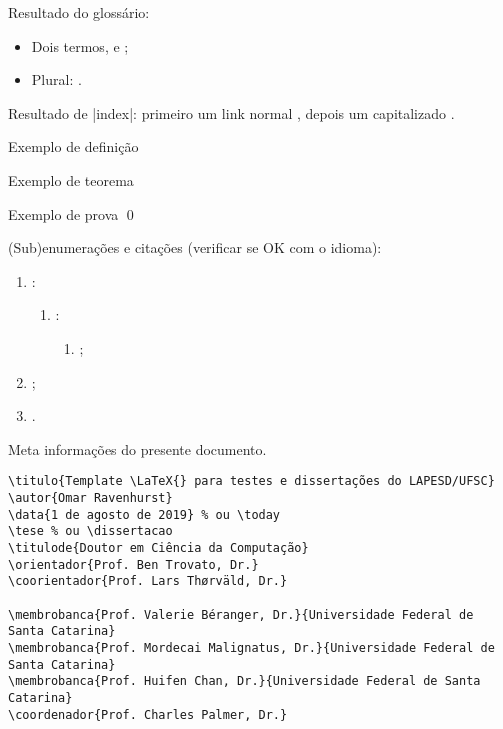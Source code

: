 Resultado do glossário:
\begin{itemize}
\item Dois termos, \polling e \proxy;
\item Plural: \proxys.
\end{itemize}

Resultado de \mla|index|: primeiro um link normal , depois um capitalizado .

\begin{defn}
  Exemplo de definição
\end{defn}

\begin{theorem}
  Exemplo de teorema
\end{theorem}

\begin{theoremproof}
  Exemplo de prova \qed
\end{theoremproof}

(Sub)enumerações e citações (verificar se OK com o idioma):
\begin{enumerate}
\item \cite{turing1937}:
  \begin{enumerate}
  \item {}:
    \begin{enumerate}
    \item {};
    \end{enumerate}
  \end{enumerate}
\item \cite{turing1937,dijkstra1968};
\item {}.
\end{enumerate}


\begin{listing}[tb]
\caption{Meta informações do presente documento.}
\label{lst:meta}
\begin{verbatim}
\titulo{Template \LaTeX{} para testes e dissertações do LAPESD/UFSC}
\autor{Omar Ravenhurst}
\data{1 de agosto de 2019} % ou \today
\tese % ou \dissertacao
\titulode{Doutor em Ciência da Computação}
\orientador{Prof. Ben Trovato, Dr.}
\coorientador{Prof. Lars Thørväld, Dr.}

\membrobanca{Prof. Valerie Béranger, Dr.}{Universidade Federal de Santa Catarina}
\membrobanca{Prof. Mordecai Malignatus, Dr.}{Universidade Federal de Santa Catarina}
\membrobanca{Prof. Huifen Chan, Dr.}{Universidade Federal de Santa Catarina}
\coordenador{Prof. Charles Palmer, Dr.}
\end{verbatim}
\end{listing}


